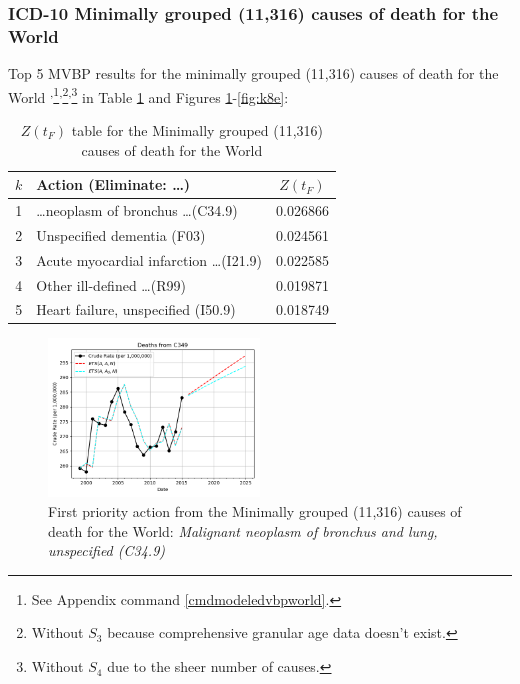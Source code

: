 \documentclass[10pt, a4paper, twocolumn]{IEEEconf}
\newcommand\footnotesstartsep{\textsuperscript{,}}
\newcommand\footnotescontinue{\textsuperscript{,}}
\begin{document}
\clearpage

\subsubsection{ICD-10 Minimally grouped (11,316) causes of death for the World}

Top 5 MVBP results for the minimally grouped (11,316) causes of death for the World \citep{whomortality,icd10vol1}\footnotesstartsep\footnote{See Appendix command \ref{cmdmodeledvbpworld}.}\footnotescontinue\footnote{\label{no_s3}Without $S_3$ because comprehensive granular age data doesn't exist.}\footnotescontinue\footnote{Without $S_4$ due to the sheer number of causes.} in Table \ref{table:ztable8} and Figures \ref{fig:k8a}-\ref{fig:k8e}:

\begin{table}[H]
  \centering
  \begin{tabular}{clc}
    \toprule
      $k$ & Action (Eliminate: \ldots) & $Z(t_F)$ \\
    \midrule
      1 & \ldots neoplasm of bronchus \ldots (C34.9) & 0.026866 \\
      2 &                 Unspecified dementia (F03) & 0.024561 \\
      3 & Acute myocardial infarction \ldots (I21.9) & 0.022585 \\
      4 &             Other ill-defined \ldots (R99) & 0.019871 \\
      5 &         Heart failure, unspecified (I50.9) & 0.018749 \\
    \bottomrule
  \end{tabular}
  \caption{$Z(t_F)$ table for the Minimally grouped (11,316) causes of death for the World}
  \label{table:ztable8}
\end{table}

\begin{figure}[H]
  \centering
  \includegraphics[width=0.5\textwidth]{results/WORLD_ICD10_MINIMALLY_GROUPED/C349_ets.png}
  \caption{First priority action from the Minimally grouped (11,316) causes of death for the World: \textit{Malignant neoplasm of bronchus and lung, unspecified (C34.9)}}\label{fig:k8a}
\end{figure}
\end{document}
